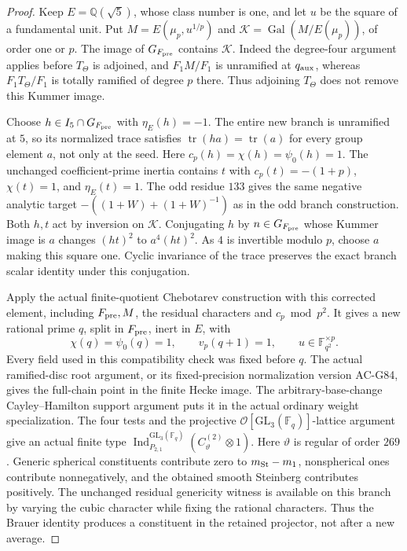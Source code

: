 \begin{proof}
Keep \(E=\mathbb Q(\sqrt5)\), whose class number is one, and
let \(u\) be the square of a fundamental unit.
Put \(M=E(\mu_p,u^{1/p})\) and
\(\mathcal K=\operatorname{Gal}(M/E(\mu_p))\), of order one
or \(p\).  The image of \(G_{F_{\rm pre}}\) contains
\(\mathcal K\).  Indeed the degree-four argument applies
before \(T_\Theta\) is adjoined, and \(F_1M/F_1\) is unramified
at \(q_{\rm aux}\), whereas \(F_1T_\Theta/F_1\) is totally
ramified of degree \(p\) there.  Thus adjoining \(T_\Theta\)
does not remove this Kummer image.

Choose \(h\in I_5\cap G_{F_{\rm pre}}\) with
\(\eta_E(h)=-1\).  The entire new branch is unramified at
\(5\), so its normalized trace satisfies
\(\operatorname{tr}(ha)=\operatorname{tr}(a)\) for every
group element \(a\), not only at the seed.
Here \(c_p(h)=\chi(h)=\psi_0(h)=1\).
The unchanged coefficient-prime inertia contains \(t\) with
\(c_p(t)=-(1+p)\), \(\chi(t)=1\), and \(\eta_E(t)=1\).
The odd residue \(133\) gives the same negative analytic target
\(-((1+W)+(1+W)^{-1})\) as in the odd branch construction.
Both \(h,t\) act by inversion on \(\mathcal K\).
Conjugating \(h\) by \(n\in G_{F_{\rm pre}}\) whose Kummer
image is \(a\) changes \((ht)^2\) to \(a^4(ht)^2\).
As \(4\) is invertible modulo \(p\), choose \(a\) making
this square one.  Cyclic invariance of the trace preserves
the exact branch scalar identity under this conjugation.

Apply the actual finite-quotient Chebotarev construction with
this corrected element, including \(F_{\rm pre},M\), the
residual characters and \(c_p\bmod p^2\).
It gives a new rational prime \(q\), split in \(F_{\rm pre}\),
inert in \(E\), with
\[
 \chi(q)=\psi_0(q)=1,\qquad v_p(q+1)=1,\qquad
             u\in\mathbb F_{q^2}^{\times p}.
 \tag{G132.17}
\]
Every field used in this compatibility check was fixed before
\(q\).  The actual ramified-disc root argument, or its
fixed-precision normalization version AC-G84, gives the
full-chain point in the finite Hecke image.  The
arbitrary-base-change Cayley--Hamilton support argument puts
it in the actual ordinary weight specialization.
The four tests and the projective
\(\mathcal O[\mathrm{GL}_3(\mathbb F_q)]\)-lattice argument
give an actual finite type
\(\operatorname{Ind}_{P_{2,1}}^{\mathrm{GL}_3(\mathbb F_q)}
 (C_\vartheta^{(2)}\otimes1)\).
Here \(\vartheta\) is regular of order \(269\).
Generic spherical constituents contribute zero to
\(m_{\rm St}-m_1\), nonspherical ones contribute nonnegatively,
and the obtained smooth Steinberg contributes positively.
The unchanged residual genericity witness is available on
this branch by varying the cubic character while fixing the
rational characters.  Thus the Brauer identity produces a
constituent in the retained projector, not after a new average.


\end{proof}
